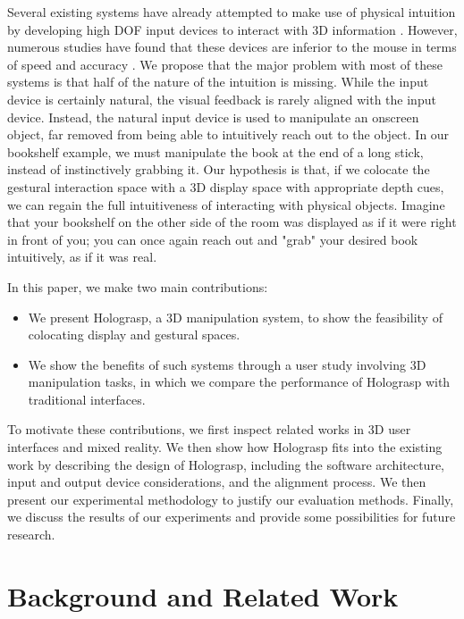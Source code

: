 \documentclass[pageno]{jpaper}
\begin{document}
Several existing systems have already attempted to make use of physical intuition by developing high DOF input 
devices to interact with 3D information \cite{manders2010gesture, mattheiss2011navigating, mine1997moving}.
However, numerous studies have found that these devices are inferior to the mouse in terms of speed and accuracy \cite{mattheiss2011navigating, study1}.
We propose that the major problem with most of these systems is that half of the nature of the intuition is missing. While the input device is certainly
natural, the visual feedback is rarely aligned with the input device. Instead, the natural input device is used to manipulate an onscreen object, far
removed from being able to intuitively reach out to the object. In our bookshelf example, we must manipulate the book at the end of a long stick, instead of
instinctively grabbing it. Our hypothesis is that, if we colocate the gestural interaction space with a 3D display space with appropriate depth cues, we can regain
the full intuitiveness of interacting with physical objects. Imagine that your bookshelf on the other side of the room was displayed as if it were right
in front of you; you can once again reach out and "grab" your desired book intuitively, as if it was real.

In this paper, we make two main contributions:
\begin{itemize}
\item We present Holograsp, a 3D manipulation system, to show the feasibility of colocating display and gestural spaces.
\item We show the benefits of such systems through a user study involving 3D manipulation tasks, in which we compare the
performance of Holograsp with traditional interfaces.
\end{itemize}

To motivate these contributions, we first inspect related works in 3D user interfaces and mixed reality. We then show how Holograsp fits
into the existing work by describing the design of Holograsp, including the software architecture, input and output device considerations,
and the alignment process. We then present our experimental methodology to justify our evaluation methods. Finally, we discuss the results
of our experiments and provide some possibilities for future research. 

\section{Background and Related Work}
\end{document}
